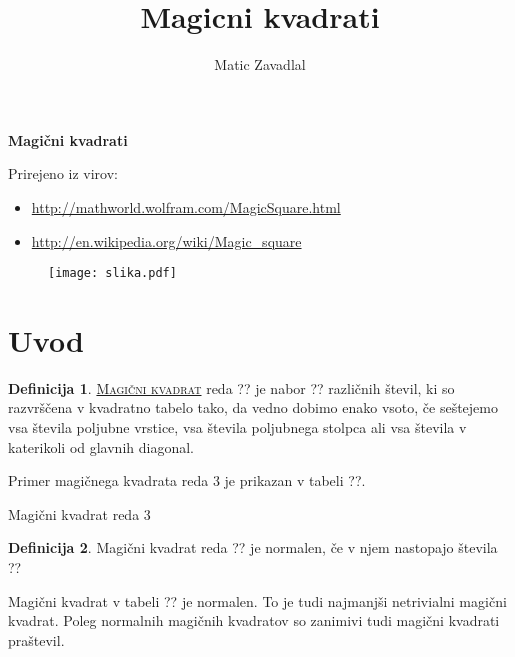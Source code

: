 \documentclass[a4paper,12pt]{article}
\title{Magicni kvadrati}
\author{Matic Zavadlal}
\theoremstyle{definition}
\newtheorem{defn}{Definicija}
\theoremstyle{plain}
\newcommand{\pojem}[1]{
   \underline{\textsc{#1}}
}
\begin{document}

\begin{center}
   \LARGE\textbf {Magični kvadrati}
\end{center}


Prirejeno iz virov:
\begin{itemize}[leftmargin=1.6cm]
   \item \url {http://mathworld.wolfram.com/MagicSquare.html}
   \item \url {http://en.wikipedia.org/wiki/Magic_square}
\end{itemize}

\begin{figure}[h]
   \centering
   \texttt{[image: slika.pdf]}
   \label{fig:slika}
\end{figure}

\tableofcontents


\newpage


\section{Uvod}


\begin{defn}
   \pojem{Magični kvadrat} reda ?? je nabor ?? različnih števil,
   ki so razvrščena v kvadratno tabelo tako, da vedno dobimo enako vsoto,
   če seštejemo vsa števila poljubne vrstice, vsa števila poljubnega
   stolpca ali vsa števila v katerikoli od glavnih diagonal.
   
   \noindent Primer magičnega kvadrata reda 3 je prikazan v tabeli ??.

   Magični kvadrat reda 3

\end{defn}

\begin{defn}

   Magični kvadrat reda ?? je normalen, če v njem nastopajo števila
   ??

   Magični kvadrat v tabeli ?? je normalen.
   To je tudi najmanjši netrivialni magični kvadrat.
   Poleg normalnih magičnih kvadratov so zanimivi tudi magični kvadrati praštevil.

\end{defn}
\end{document}
